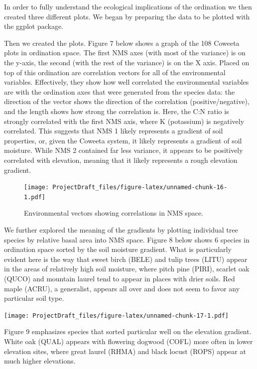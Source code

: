 \documentclass[
  12pt,
]{article}
\begin{document}
\newpage

In order to fully understand the ecological implications of the
ordination we then created three different plots. We began by preparing
the data to be plotted with the ggplot package.

\newpage

Then we created the plots. Figure 7 below shows a graph of the 108
Coweeta plots in ordination space. The first NMS axes (with most of the
variance) is on the y-axis, the second (with the rest of the variance)
is on the X axis. Placed on top of this ordination are correlation
vectors for all of the environmental variables. Effectively, they show
how well correlated the environmental variables are with the ordination
axes that were generated from the species data: the direction of the
vector shows the direction of the correlation (positive/negative), and
the length shows how strong the correlation is. Here, the C:N ratio is
strongly correlated with the first NMS axis, where K (potassium) is
negatively correlated. This suggests that NMS 1 likely represents a
gradient of soil properties, or, given the Coweeta system, it likely
represents a gradient of soil moisture. While NMS 2 contained far less
variance, it appears to be positively correlated with elevation, meaning
that it likely represents a rough elevation gradient.

\begin{figure}
\centering
\texttt{[image: ProjectDraft\_files/figure-latex/unnamed-chunk-16-1.pdf]}
\caption{Environmental vectors showing correlations in NMS space.}
\end{figure}

\newpage

We further explored the meaning of the gradients by plotting individual
tree species by relative basal area into NMS space. Figure 8 below shows
6 species in ordination space sorted by the soil moisture gradient. What
is particularly evident here is the way that sweet birch (BELE) and
tulip trees (LITU) appear in the areas of relatively high soil moisture,
where pitch pine (PIRI), scarlet oak (QUCO) and mountain laurel tend to
appear in places with drier soils. Red maple (ACRU), a generalist,
appears all over and does not seem to favor any particular soil type.

\texttt{[image: ProjectDraft\_files/figure-latex/unnamed-chunk-17-1.pdf]}
\newpage

Figure 9 emphasizes species that sorted particular well on the elevation
gradient. White oak (QUAL) appears with flowering dogwood (COFL) more
often in lower elevation sites, where great laurel (RHMA) and black
locust (ROPS) appear at much higher elevations.
\end{document}

